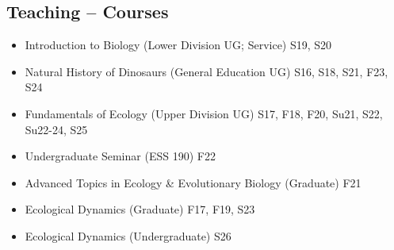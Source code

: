\documentclass[margin,line,12pt]{res}
\begin{document}
\begin{resume}
\section{\sc Teaching -- Courses}
\begin{itemize}
	\item Introduction to Biology (Lower Division UG; Service) \hfill S19, S20
	\item Natural History of Dinosaurs (General Education UG) \hfill S16, S18, S21, F23, S24
	\item Fundamentals of Ecology (Upper Division UG) \hfill S17, F18, F20, Su21, S22, Su22-24, S25
	\item Undergraduate Seminar (ESS 190) \hfill F22
	\item Advanced Topics in Ecology \& Evolutionary Biology (Graduate) \hfill F21
	\item Ecological Dynamics (Graduate) \hfill F17, F19, S23
	\item Ecological Dynamics (Undergraduate) \hfill S26
\end{itemize}




\end{resume}
\end{document}
